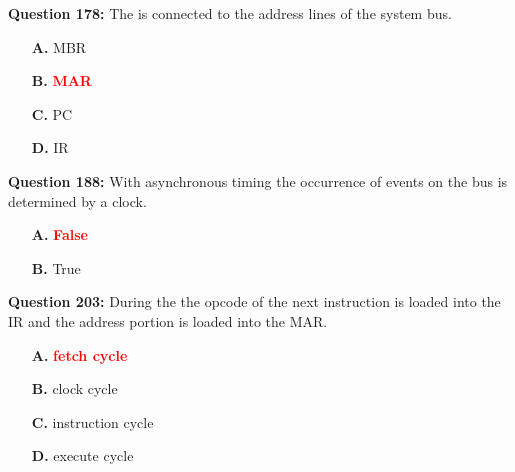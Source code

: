 \documentclass[12pt,a4paper]{article}
\begin{document}
\vspace{0.5cm}

\vspace{0.5cm}

\textbf{Question 178:} The \underline{\hspace{1.5cm}} is connected to the address lines of the system bus.

\begin{itemize}
    \item[\textbf{A.}] MBR
    \item[\textbf{B.}] \textcolor{red}{\textbf{MAR}}
    \item[\textbf{C.}] PC
    \item[\textbf{D.}] IR
\end{itemize}

\vspace{0.5cm}

\vspace{0.5cm}

\textbf{Question 188:} With asynchronous timing the occurrence of events on the bus is determined by a clock.

\begin{itemize}
    \item[\textbf{A.}] \textcolor{red}{\textbf{False}}
    \item[\textbf{B.}] True
\end{itemize}

\vspace{0.5cm}

\vspace{0.5cm}

\vspace{0.5cm}

\vspace{0.5cm}

\vspace{0.5cm}

\vspace{0.5cm}

\textbf{Question 203:} During the \underline{\hspace{1.5cm}} the opcode of the next instruction is loaded into the IR and the address portion is loaded into the MAR.

\begin{itemize}
    \item[\textbf{A.}] \textcolor{red}{\textbf{fetch cycle}}
    \item[\textbf{B.}] clock cycle
    \item[\textbf{C.}] instruction cycle
    \item[\textbf{D.}] execute cycle
\end{itemize}
\end{document}
